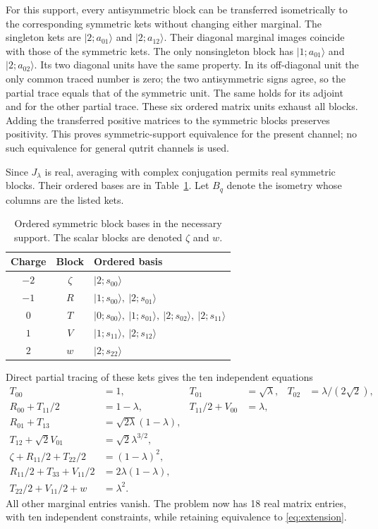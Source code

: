 \documentclass[11pt]{article}
\newcommand{\ket}[1]{\lvert #1\rangle}
\begin{document}
For this support, every antisymmetric block can be transferred isometrically
to the corresponding symmetric kets without changing either marginal.
The singleton kets are $\ket{2;a_{01}}$ and $\ket{2;a_{12}}$.
Their diagonal marginal images coincide with those of the symmetric kets.
The only nonsingleton block has $\ket{1;a_{01}}$ and
$\ket{2;a_{02}}$. Its two diagonal units have the same property.
In its off-diagonal unit the only common traced number is zero;
the two antisymmetric signs agree, so the partial trace equals that
of the symmetric unit. The same holds for its adjoint and for the
other partial trace. These six ordered matrix units exhaust all blocks.
Adding the transferred positive matrices to the symmetric blocks preserves
positivity. This proves symmetric-support equivalence for the present
channel; no such equivalence for general qutrit channels is used.

Since $J_\lambda$ is real, averaging with complex conjugation permits
real symmetric blocks. Their ordered bases are in Table~\ref{tab:bases}.
Let $B_q$ denote the isometry whose columns are the listed kets.
\begin{table}[htbp]
\centering
\caption{Ordered symmetric block bases in the necessary support.
The scalar blocks are denoted $\zeta$ and $w$.}\label{tab:bases}
\begin{tabular}{ccl}
\toprule
Charge & Block & Ordered basis\\
\midrule
$-2$ & $\zeta$ & $\ket{2;s_{00}}$\\
$-1$ & $R$ & $\ket{1;s_{00}},\ \ket{2;s_{01}}$\\
$0$ & $T$ & $\ket{0;s_{00}},\ \ket{1;s_{01}},\ \ket{2;s_{02}},\ \ket{2;s_{11}}$\\
$1$ & $V$ & $\ket{1;s_{11}},\ \ket{2;s_{12}}$\\
$2$ & $w$ & $\ket{2;s_{22}}$\\
\bottomrule
\end{tabular}
\end{table}
Direct partial tracing of these kets gives the ten independent equations
\begin{equation}\label{eq:marginals}
\begin{aligned}
T_{00}&=1,& T_{01}&=\sqrt\lambda,& T_{02}&=\lambda/(2\sqrt2),\\
R_{00}+T_{11}/2&=1-\lambda,& T_{11}/2+V_{00}&=\lambda,\\
R_{01}+T_{13}&=\sqrt{2\lambda}(1-\lambda),\\
T_{12}+\sqrt2 V_{01}&=\sqrt2\lambda^{3/2},\\
\zeta+R_{11}/2+T_{22}/2&=(1-\lambda)^2,\\
R_{11}/2+T_{33}+V_{11}/2&=2\lambda(1-\lambda),\\
T_{22}/2+V_{11}/2+w&=\lambda^2.
\end{aligned}
\end{equation}
All other marginal entries vanish. The problem now has 18 real matrix
entries, with ten independent constraints, while retaining equivalence
to \eqref{eq:extension}.
\end{document}
